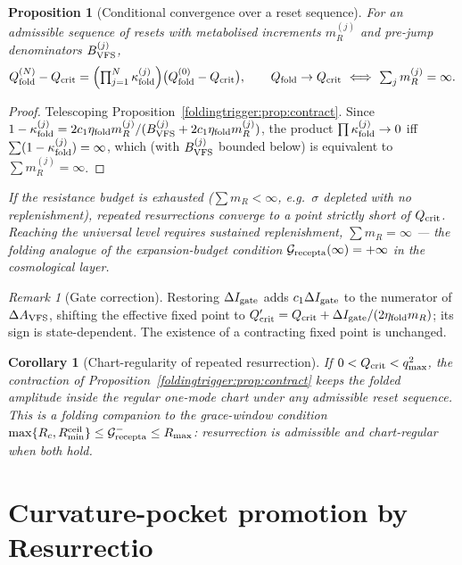 \documentclass[11pt,a4paper,oneside]{book}
\newcommand{\Grec}{\mathcal G_{\rm recepta}}
\newcommand{\Igate}{I_{\rm gate}}
\newcommand{\note}[1]{\textcolor{black!65}{\emph{#1}}}
\newcommand{\Avfs}{A_{\rm VFS}}
\newcommand{\Bvfs}{B_{\rm VFS}}
\newcommand{\Qf}{Q_{\rm fold}}
\newcommand{\etaf}{\eta_{\rm fold}}
\theoremstyle{plain}
\newtheorem{proposition}{Proposition}[chapter]
\newtheorem{corollary}{Corollary}[chapter]
\theoremstyle{definition}
\theoremstyle{remark}
\newtheorem*{remark}{Remark}
\begin{document}
\begin{proposition}[Conditional convergence over a reset sequence]\label{foldingtrigger:prop:converge}
For an admissible sequence of resets with metabolised increments $m_R^{(j)}$ and pre-jump denominators
$\Bvfs^{(j)}$,
\begin{equation}
\Qf^{(N)}-Q_{\rm crit}=\Bigl(\textstyle\prod_{j=1}^{N}\kappa_{\rm fold}^{(j)}\Bigr)\bigl(\Qf^{(0)}-Q_{\rm crit}\bigr),
\qquad
\Qf\to Q_{\rm crit}\ \Longleftrightarrow\ \sum_j m_R^{(j)}=\infty.
\end{equation}
\end{proposition}
\begin{proof}
Telescoping Proposition~\ref{foldingtrigger:prop:contract}. Since
$1-\kappa_{\rm fold}^{(j)}=2c_1\etaf m_R^{(j)}/(\Bvfs^{(j)}+2c_1\etaf m_R^{(j)})$, the product
$\prod\kappa_{\rm fold}^{(j)}\to0$ iff $\sum(1-\kappa_{\rm fold}^{(j)})=\infty$, which (with $\Bvfs^{(j)}$
bounded below) is equivalent to $\sum m_R^{(j)}=\infty$.
\end{proof}

\note{If the resistance budget is exhausted ($\sum m_R<\infty$, e.g.\ $\sigma$ depleted with no
replenishment), repeated resurrections converge to a point strictly short of $Q_{\rm crit}$. Reaching the
universal level requires sustained replenishment, $\sum m_R=\infty$ --- the folding analogue of the
expansion-budget condition $\Grec(\infty)=+\infty$ in the cosmological layer.}

\begin{remark}[Gate correction]
Restoring $\Delta\Igate$ adds $c_1\Delta\Igate$ to the numerator of $\Delta\Avfs$, shifting the effective
fixed point to $Q_{\rm crit}'=Q_{\rm crit}+\Delta\Igate/(2\etaf m_R)$; its sign is state-dependent. The
existence of a contracting fixed point is unchanged.
\end{remark}

\begin{corollary}[Chart-regularity of repeated resurrection]\label{foldingtrigger:cor:chart}
If $0<Q_{\rm crit}<q_{\max}^2$, the contraction of Proposition~\ref{foldingtrigger:prop:contract} keeps the folded
amplitude inside the regular one-mode chart under any admissible reset sequence. This is a folding
companion to the grace-window condition
$\max\{R_c,R_{\min}^{\rm ceil}\}\le\Grec^-\le R_{\max}$: resurrection is admissible \emph{and}
chart-regular when both hold.
\end{corollary}

\section{Curvature-pocket promotion by Resurrectio}\label{foldingtrigger:sec:pocket}
\end{document}
